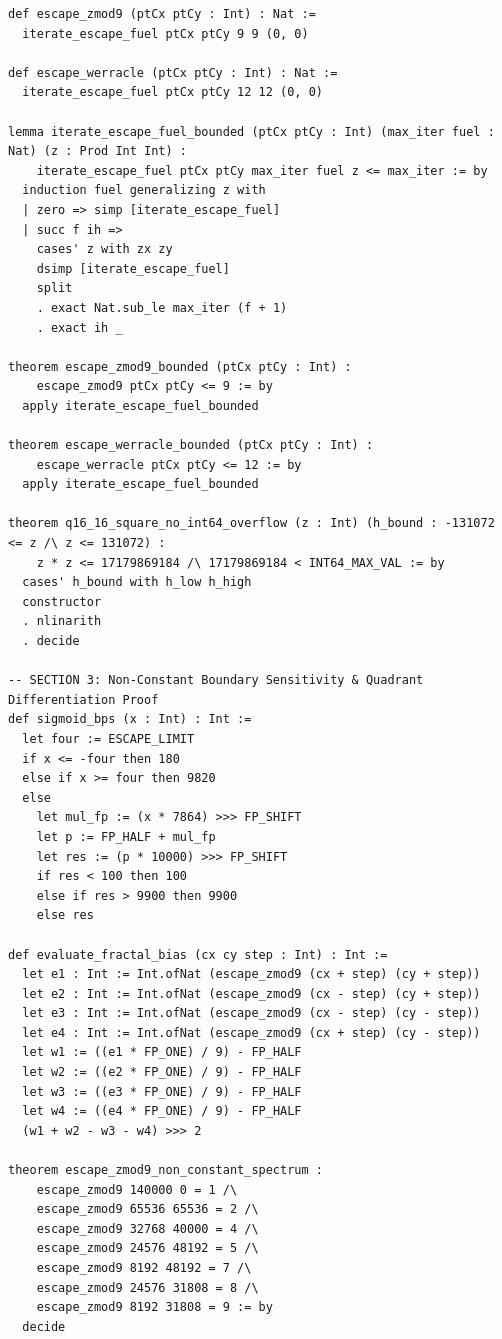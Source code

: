 \documentclass[10pt,a4paper]{article}
\begin{document}
\begin{lstlisting}[language=Lean4,caption={Complete verified Lean 4 proof module (\texttt{WerracleProof.lean}, compiled under Lean \texttt{v4.34.1} + Mathlib4, 0 \texttt{sorry}).}]
def escape_zmod9 (ptCx ptCy : Int) : Nat :=
  iterate_escape_fuel ptCx ptCy 9 9 (0, 0)

def escape_werracle (ptCx ptCy : Int) : Nat :=
  iterate_escape_fuel ptCx ptCy 12 12 (0, 0)

lemma iterate_escape_fuel_bounded (ptCx ptCy : Int) (max_iter fuel : Nat) (z : Prod Int Int) :
    iterate_escape_fuel ptCx ptCy max_iter fuel z <= max_iter := by
  induction fuel generalizing z with
  | zero => simp [iterate_escape_fuel]
  | succ f ih =>
    cases' z with zx zy
    dsimp [iterate_escape_fuel]
    split
    . exact Nat.sub_le max_iter (f + 1)
    . exact ih _

theorem escape_zmod9_bounded (ptCx ptCy : Int) :
    escape_zmod9 ptCx ptCy <= 9 := by
  apply iterate_escape_fuel_bounded

theorem escape_werracle_bounded (ptCx ptCy : Int) :
    escape_werracle ptCx ptCy <= 12 := by
  apply iterate_escape_fuel_bounded

theorem q16_16_square_no_int64_overflow (z : Int) (h_bound : -131072 <= z /\ z <= 131072) :
    z * z <= 17179869184 /\ 17179869184 < INT64_MAX_VAL := by
  cases' h_bound with h_low h_high
  constructor
  . nlinarith
  . decide

-- SECTION 3: Non-Constant Boundary Sensitivity & Quadrant Differentiation Proof
def sigmoid_bps (x : Int) : Int :=
  let four := ESCAPE_LIMIT
  if x <= -four then 180
  else if x >= four then 9820
  else
    let mul_fp := (x * 7864) >>> FP_SHIFT
    let p := FP_HALF + mul_fp
    let res := (p * 10000) >>> FP_SHIFT
    if res < 100 then 100
    else if res > 9900 then 9900
    else res

def evaluate_fractal_bias (cx cy step : Int) : Int :=
  let e1 : Int := Int.ofNat (escape_zmod9 (cx + step) (cy + step))
  let e2 : Int := Int.ofNat (escape_zmod9 (cx - step) (cy + step))
  let e3 : Int := Int.ofNat (escape_zmod9 (cx - step) (cy - step))
  let e4 : Int := Int.ofNat (escape_zmod9 (cx + step) (cy - step))
  let w1 := ((e1 * FP_ONE) / 9) - FP_HALF
  let w2 := ((e2 * FP_ONE) / 9) - FP_HALF
  let w3 := ((e3 * FP_ONE) / 9) - FP_HALF
  let w4 := ((e4 * FP_ONE) / 9) - FP_HALF
  (w1 + w2 - w3 - w4) >>> 2

theorem escape_zmod9_non_constant_spectrum :
    escape_zmod9 140000 0 = 1 /\
    escape_zmod9 65536 65536 = 2 /\
    escape_zmod9 32768 40000 = 4 /\
    escape_zmod9 24576 48192 = 5 /\
    escape_zmod9 8192 48192 = 7 /\
    escape_zmod9 24576 31808 = 8 /\
    escape_zmod9 8192 31808 = 9 := by
  decide


\end{lstlisting}
\end{document}
